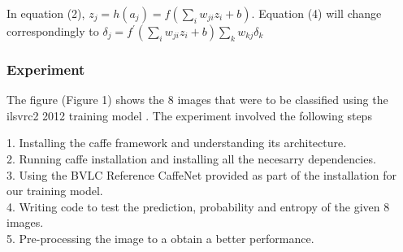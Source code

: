 \documentclass[conference]{IEEEtran}
\begin{document}
In equation (2),   $ z_{j} = h(a_{j}) = f( \sum\limits_{i} w _{ji} z _{i} + b) $. Equation (4) will change correspondingly to $\delta _{j} = f^{'}(\sum\limits_{i} w _{ji} z _{i} + b) \sum\limits_{k} w_{kj} \delta_{k} $ \\
 

\subsubsection{Experiment}


The figure (Figure 1) shows the 8 images that were to be classified using the ilsvrc2 2012 training model \cite{IEEEhowto:kopka}. The experiment involved the following steps

1. Installing the caffe framework and understanding its architecture. \\
2. Running  caffe installation and installing all the necesarry dependencies. \\
3. Using the  BVLC Reference CaffeNet provided\cite{caffe} as part of the installation for our training model. \\
4. Writing code to test the prediction, probability and entropy of the given 8 images.\\
5. Pre-processing the image to a obtain a better performance.\\
\end{document}
